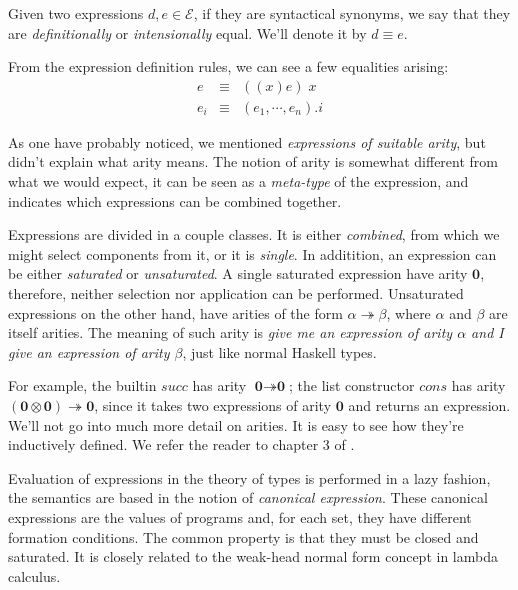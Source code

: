 \begin{mydef}
Given two expressions $d, e \in \mathcal{E}$, if they are syntactical synonyms, we say
that they are \emph{definitionally} or \emph{intensionally} equal. We'll denote it
by $d \equiv e$.
\end{mydef}

From the expression definition rules, we can see a few equalities arising:
\begin{eqnarray*}
  e & \equiv & ((x)e)\;x \\
  e_i & \equiv & (e_1, \cdots, e_n).i
\end{eqnarray*}

As one have probably noticed, we mentioned \emph{expressions of suitable arity}, but didn't explain
what arity means. The notion of arity is somewhat different from what we would expect, it can
be seen as a \emph{meta-type} of the expression, and indicates which expressions can be combined
together.

\newcommand{\arzero}{\textbf{0}}
\newcommand{\ararr}{\twoheadrightarrow}
\newcommand{\armul}{\otimes}

Expressions are divided in a couple classes. It is either \emph{combined}, from which we
might select components from it, or it is \emph{single}. In additition, an expression
can be either \emph{saturated} or \emph{unsaturated}. A single saturated expression
have arity $\arzero$, therefore, neither selection nor application can be performed.
Unsaturated expressions on the other hand, have arities of the form $\alpha \ararr \beta$,
where $\alpha$ and $\beta$ are itself arities. The meaning of such arity is \emph{give me an expression
of arity $\alpha$ and I give an expression of arity $\beta$}, just like normal Haskell types. 

For example, the builtin $succ$ has arity $\arzero \ararr \arzero$; the list constructor
$cons$ has arity $(\arzero \armul \arzero) \ararr \arzero$, since it takes two expressions
of arity $\arzero$ and returns an expression. We'll not go into much more detail 
on arities. It is easy to see how they're inductively defined. We refer the reader
to chapter 3 of \cite{nords90}.

Evaluation of expressions in the theory of types is performed in a lazy fashion, the semantics
are based in the notion of \emph{canonical expression}. These canonical expressions are the values
of programs and, for each set, they have different formation conditions. The common property is
that they must be closed and saturated. It is closely related to the weak-head normal form concept in
lambda calculus.  

